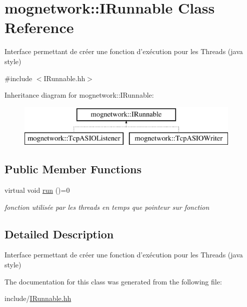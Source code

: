 \hypertarget{classmognetwork_1_1_i_runnable}{\section{mognetwork\-:\-:I\-Runnable Class Reference}
\label{classmognetwork_1_1_i_runnable}
}


Interface permettant de créer une fonction d'exécution pour les Threads (java style)  




{\ttfamily \#include $<$I\-Runnable.\-hh$>$}

Inheritance diagram for mognetwork\-:\-:I\-Runnable\-:\begin{figure}[H]
\begin{center}
\leavevmode
\includegraphics[height=2.000000cm]{classmognetwork_1_1_i_runnable}
\end{center}
\end{figure}
\subsection*{Public Member Functions}
\begin{DoxyCompactItemize}
\item 
\hypertarget{classmognetwork_1_1_i_runnable_ac53515c8ecf2b2c79cb9c161fdd600d1}{virtual void \hyperlink{classmognetwork_1_1_i_runnable_ac53515c8ecf2b2c79cb9c161fdd600d1}{run} ()=0}\label{classmognetwork_1_1_i_runnable_ac53515c8ecf2b2c79cb9c161fdd600d1}

\begin{DoxyCompactList}\small\item\em fonction utilisée par les threads en temps que pointeur sur fonction \end{DoxyCompactList}\end{DoxyCompactItemize}


\subsection{Detailed Description}
Interface permettant de créer une fonction d'exécution pour les Threads (java style) 

The documentation for this class was generated from the following file\-:\begin{DoxyCompactItemize}
\item 
include/\hyperlink{_i_runnable_8hh}{I\-Runnable.\-hh}\end{DoxyCompactItemize}

